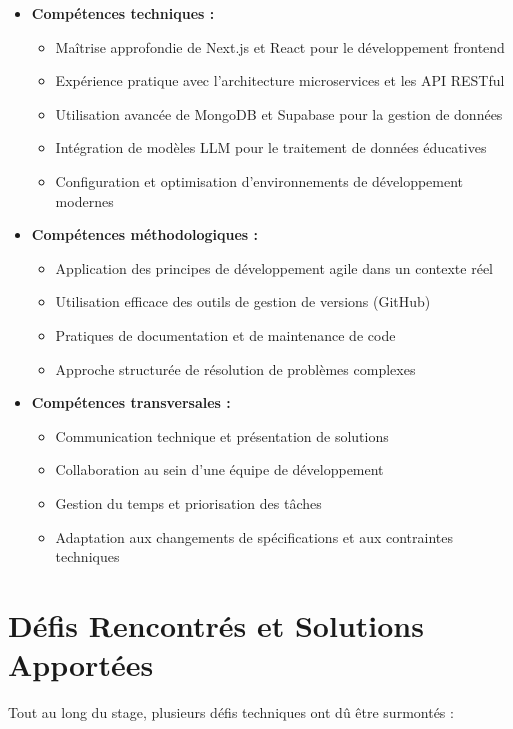 \documentclass[12pt, a4paper]{report}
\begin{document}
\begin{itemize}
  \item \textbf{Compétences techniques :}
  \begin{itemize}
    \item Maîtrise approfondie de Next.js et React pour le développement frontend
    \item Expérience pratique avec l'architecture microservices et les API RESTful
    \item Utilisation avancée de MongoDB et Supabase pour la gestion de données
    \item Intégration de modèles LLM pour le traitement de données éducatives
    \item Configuration et optimisation d'environnements de développement modernes
  \end{itemize}
  
  \item \textbf{Compétences méthodologiques :}
  \begin{itemize}
    \item Application des principes de développement agile dans un contexte réel
    \item Utilisation efficace des outils de gestion de versions (GitHub)
    \item Pratiques de documentation et de maintenance de code
    \item Approche structurée de résolution de problèmes complexes
  \end{itemize}
  
  \item \textbf{Compétences transversales :}
  \begin{itemize}
    \item Communication technique et présentation de solutions
    \item Collaboration au sein d'une équipe de développement
    \item Gestion du temps et priorisation des tâches
    \item Adaptation aux changements de spécifications et aux contraintes techniques
  \end{itemize}
\end{itemize}

\section{Défis Rencontrés et Solutions Apportées}

Tout au long du stage, plusieurs défis techniques ont dû être surmontés :
\end{document}
